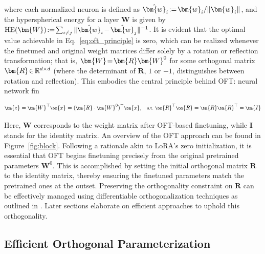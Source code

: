 where each normalized neuron is defined as $\thickmuskip=2mu \medmuskip=2mu \hat{\bm{w}}_i:=\bm{w}_i/\|\bm{w}_i\|$, and the hyperspherical energy for a layer $\bm{W}$ is given by $\thickmuskip=2mu \medmuskip=2mu \text{HE}(\bm{W}):= \sum_{i\neq j} \|\hat{\bm{w}}_i-\hat{\bm{w}}_j\|^{-1}$. It is evident that the optimal value achievable in Eq.~\eqref{eq:oft_principle} is zero, which can be realized whenever the finetuned and original weight matrices differ solely by a rotation or reflection transformation; that is, $\thickmuskip=2mu \medmuskip=2mu \bm{W}=\bm{R}\bm{W}^0$ for some orthogonal matrix $\thickmuskip=2mu \medmuskip=2mu \bm{R}\in\mathbb{R}^{d\times d}$ (where the determinant of $\bm{R}$, $1$ or $-1$, distinguishes between rotation and reflection). This embodies the central principle behind OFT: neural network fin

\begin{equation}\label{eq:oft_general}
    \footnotesize
    \bm{z} = \bm{W}^\top \bm{x} = (\bm{R} \cdot \bm{W}^0)^\top \bm{x}, ~~~ \text{s.t.}~ \bm{R}^\top \bm{R} = \bm{R} \bm{R}^\top = \bm{I}
\end{equation}

Here, $\bm{W}$ corresponds to the weight matrix after OFT-based finetuning, while $\bm{I}$ stands for the identity matrix. An overview of the OFT approach can be found in Figure~\ref{fig:block}. Following a rationale akin to LoRA's zero initialization, it is essential that OFT begins finetuning precisely from the original pretrained parameters $\bm{W}^0$. This is accomplished by setting the initial orthogonal matrix $\bm{R}$ to the identity matrix, thereby ensuring the finetuned parameters match the pretrained ones at the outset. Preserving the orthogonality constraint on $\bm{R}$ can be effectively managed using differentiable orthogonalization techniques as outlined in \cite{liu2021orthogonal,lezcano2019cheap}. Later sections elaborate on efficient approaches to uphold this orthogonality.

\subsection{Efficient Orthogonal Parameterization}\label{sect:eff_ortho}


